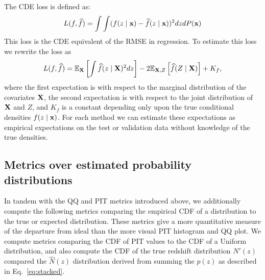 
The CDE loss is defined as:
\begin{equation} \label{eq:cde-loss}
L(f, \widehat{f}) = \int \int (f(z \mid {\mathbf{x}}) - \widehat{f}(z \mid {\mathbf{x}}))^{2} dz dP({\mathbf{x}})
\end{equation}
This loss is the CDE equivalent of the RMSE in regression. To estimate this loss we rewrite the loss as
\begin{equation} \label{eq:estimated-cde-loss}
L(f, \widehat{f}) = \mathbb{E}_{\mathbf{X}} \left[\int \widehat{f}(z \mid {\mathbf{X}})^{2} dz\right] - 2 \mathbb{E}_{{\mathbf{X}},Z}\left[\widehat{f}(Z \mid {\mathbf{X}})\right] + K_{f},
\end{equation}
where the first expectation is with respect to the marginal distribution of the covariates ${\mathbf{X}}$, the second expectation is with respect to the joint distribution of ${\mathbf{X}}$ and $Z$, and $K_{f}$ is a constant depending only upon the true conditional densities $f(z\mid {\mathbf{x}})$.
For each method we can estimate these expectations as empirical expectations on the test or validation data \citep[Eq.~7 in][]{Izbicki:17b} without knowledge of the true densities.


\subsection{Metrics over estimated probability distributions}
\label{sec:quantmet}

In tandem with the QQ and PIT metrics introduced above, we additionally compute the following metrics comparing the empirical CDF of a distribution to the true or expected distribution.  These metrics give a more quantitative measure of the departure from ideal than the more visual PIT histogram and QQ plot.  We compute metrics comparing the CDF of PIT values to the CDF of a Uniform distribution, and also compute the CDF of the true redshift distribution $N'(z)$ compared the $\hat{N}(z)$ distribution derived from summing the $p(z)$ as described in Eq.~\ref{eq:stacked}.

